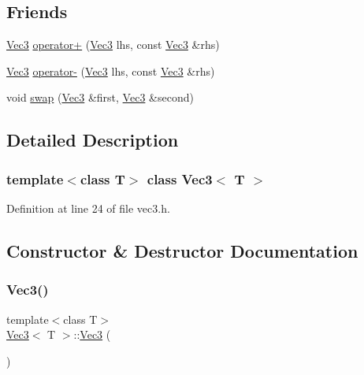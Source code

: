 \subsection*{Friends}
\begin{DoxyCompactItemize}
\item 
\mbox{\hyperlink{class_vec3}{Vec3}} \mbox{\hyperlink{class_vec3_aa1d442ec2866889ad4514da9a51c8be5}{operator+}} (\mbox{\hyperlink{class_vec3}{Vec3}} lhs, const \mbox{\hyperlink{class_vec3}{Vec3}} \&rhs)
\item 
\mbox{\hyperlink{class_vec3}{Vec3}} \mbox{\hyperlink{class_vec3_acf4273db43751acb5347ab35a971387d}{operator-\/}} (\mbox{\hyperlink{class_vec3}{Vec3}} lhs, const \mbox{\hyperlink{class_vec3}{Vec3}} \&rhs)
\item 
void \mbox{\hyperlink{class_vec3_ab0da0dbcf5bf321872155851732ffc2f}{swap}} (\mbox{\hyperlink{class_vec3}{Vec3}} \&first, \mbox{\hyperlink{class_vec3}{Vec3}} \&second)
\end{DoxyCompactItemize}


\subsection{Detailed Description}
\subsubsection*{template$<$class T$>$\newline
class Vec3$<$ T $>$}



Definition at line 24 of file vec3.\+h.



\subsection{Constructor \& Destructor Documentation}
\mbox{\label{class_vec3_a7c150f37ecfa78ced8b83bd95908cc33}} 
\subsubsection{\texorpdfstring{Vec3()}{Vec3()}\hspace{0.1cm}{\footnotesize\ttfamily [1/4]}}
{\footnotesize\ttfamily template$<$class T$>$ \\
\mbox{\hyperlink{class_vec3}{Vec3}}$<$ T $>$\+::\mbox{\hyperlink{class_vec3}{Vec3}} (\begin{DoxyParamCaption}{ }\end{DoxyParamCaption})\hspace{0.3cm}{\ttfamily [inline]}}



